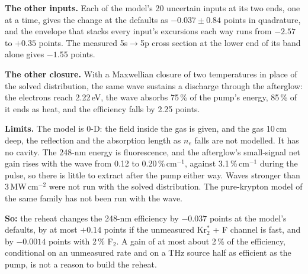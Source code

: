 \documentclass[11pt]{article}
\newcommand{\Krts}{Kr\ensuremath{_2^*}}
\newcommand{\Ft}{F\ensuremath{_2}}
\begin{document}
\textbf{The other inputs.} Each of the model's 20 uncertain inputs at its two ends, one at a time,
gives the change at the defaults as $-0.037\pm0.84$ points in quadrature, and the envelope that
stacks every input's excursions each way runs from $-2.57$ to $+0.35$ points. The measured
5s$\to$5p cross section at the lower end of its band alone gives $-1.55$ points.

\textbf{The other closure.} With a Maxwellian closure of two temperatures in place of the solved
distribution, the same wave sustains a discharge through the afterglow: the electrons reach
2.22\,eV, the wave absorbs 75\,\% of the pump's energy, 85\,\% of it ends as heat, and the
efficiency falls by 2.25 points.

\textbf{Limits.} The model is 0-D: the field inside the gas is given, and the gas 10\,cm deep,
the reflection and the absorption length as $n_e$ falls are not modelled. It has no cavity. The
248-nm energy is fluorescence, and the afterglow's small-signal net gain rises with the wave
from 0.12 to 0.20\,\%\,cm$^{-1}$, against 3.1\,\%\,cm$^{-1}$ during the pulse, so there is little to
extract after the pump either way. Waves stronger than 3\,MW\,cm$^{-2}$ were not run with the solved
distribution. The pure-krypton model of the same family has not been run with the wave.

\textbf{So:} the reheat changes the 248-nm efficiency by $-0.037$ points at the model's defaults,
by at most $+0.14$ points if the unmeasured \Krts{} + F channel is fast, and by $-0.0014$ points
with 2\,\% \Ft{}. A gain of at most about 2\,\% of the efficiency, conditional on an unmeasured
rate and on a THz source half as efficient as the pump, is not a reason to build the reheat.

\end{document}
